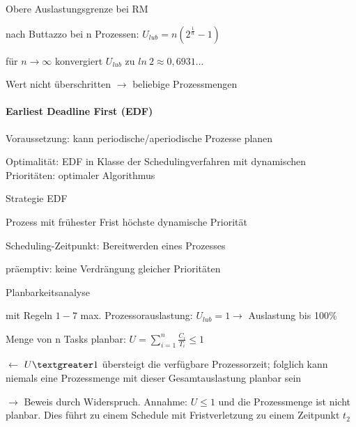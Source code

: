 \documentclass[a4paper]{article}
\begin{document}
\begin{multicols}{3}
\begin{itemize*}
\begin{itemize*}
        \end{itemize*}
        \item Obere Auslastungsgrenze bei RM
        \begin{itemize*}
            \item nach Buttazzo bei n Prozessen: $U_{lub}=n(2^{\frac{1}{n}}-1)$
            \item für $n\rightarrow\infty$ konvergiert $U_{lub}$ zu $ln\ 2 \approx 0,6931...$
            \item Wert nicht überschritten $\rightarrow$ beliebige Prozessmengen
        \end{itemize*}
    \end{itemize*}

    \paragraph{Earliest Deadline First (EDF)}
    \begin{itemize*}
        \item Voraussetzung: kann periodische/aperiodische Prozesse planen
        \item Optimalität: EDF in Klasse der Schedulingverfahren mit dynamischen Prioritäten: optimaler Algorithmus
        \item Strategie EDF
        \begin{itemize*}
            \item Prozess mit frühester Frist höchste dynamische Priorität
            \item Scheduling-Zeitpunkt: Bereitwerden eines Prozesses
            \item präemptiv: keine Verdrängung gleicher Prioritäten
        \end{itemize*}
        \item Planbarkeitsanalyse
        \begin{itemize*}
            \item mit Regeln $1-7$ max. Prozessorauslastung: $U_{lub}= 1\rightarrow$ Auslastung bis 100\%
            \item Menge von n Tasks planbar: $U=\sum_{i=1}^n \frac{C_i}{T_i}\leq 1$
            \item[$\leftarrow$] $U\textgreater1$ übersteigt die verfügbare Prozessorzeit; folglich kann niemals eine Prozessmenge mit dieser Gesamtauslastung planbar sein
            \item[$\rightarrow$] Beweis durch Widerspruch. Annahme: $U\leq 1$ und die Prozessmenge ist nicht planbar. Dies führt zu einem Schedule mit Fristverletzung zu einem Zeitpunkt $t_2$
        \end{itemize*}
    \end{itemize*}


\end{multicols}
\end{document}
